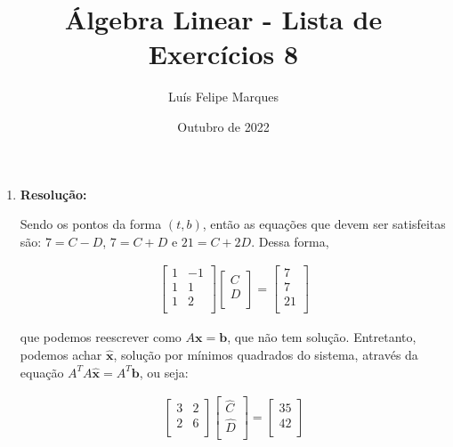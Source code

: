 \documentclass[leqno]{article}
\title{Álgebra Linear - Lista de Exercícios 8}
\author{Luís Felipe Marques}
\date{Outubro de 2022}
\begin{document}
 
\maketitle

\begin{enumerate}
    \item 
    
    \textbf{Resolução:}
    
    Sendo os pontos da forma $(t, b)$, então as equações que devem ser satisfeitas são: $7=C-D$, $7=C+D$ e $21=C+2D$. Dessa forma,
    
    \begin{align*}
        \begin{bmatrix}
            1 & -1\\
            1 & 1\\
            1 & 2\\
        \end{bmatrix}\begin{bmatrix}
            C\\
            D\\
        \end{bmatrix}=\begin{bmatrix}
            7\\
            7\\
            21\\
        \end{bmatrix}
    \end{align*}
    
    que podemos reescrever como $A\textbf{x}=\textbf{b}$, que não tem solução. Entretanto, podemos achar $\hat{\textbf{x}}$, solução por mínimos quadrados do sistema, através da equação $A^TA\hat{\textbf{x}}=A^T\textbf{b}$, ou seja:
    
    \begin{align*}
        \begin{bmatrix}
            3 & 2\\
            2 & 6\\
        \end{bmatrix}\begin{bmatrix}
            \hat{C}\\
            \hat{D}\\
        \end{bmatrix}=\begin{bmatrix}
            35\\
            42\\
        \end{bmatrix}
    \end{align*}
    

\end{enumerate}
\end{document}

